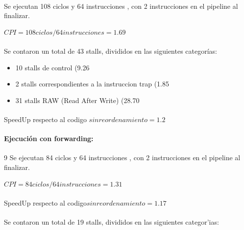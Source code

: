 \documentclass[a4paper,11pt]{article}
\begin{document}
\begin{enumerate}
\paragraph{}
Se ejecutan 108 ciclos y 64 instrucciones , con 2 instrucciones en el  pipeline al finalizar.

\begin{center}
$CPI = 108 ciclos / 64 instrucciones = 1.69 $
\end{center}

\paragraph{}
Se contaron un total de 43 stalls, divididos en las siguientes categorías:

\begin{itemize}
 \item 10 stalls de control (9.26%
 \item  2  stalls correspondientes a la instruccion trap (1.85%
 \item  31 stalls RAW (Read After Write) (28.70%
\end{itemize}

\paragraph{}
SpeedUp respecto al codigo $sin reordenamiento = 1.2$

\paragraph{Ejecuci\'on con forwarding:}

\paragraph{}9
Se ejecutan 84 ciclos y 64 instrucciones , con 2 instrucciones en el  pipeline al finalizar.

\begin{center}
$CPI = 84 ciclos / 64 instrucciones = 1.31$
\end{center}

\paragraph{}
SpeedUp respecto al codigo$ sin reordenamiento = 1.17$

\paragraph{} 
Se contaron un total de 19 stalls, divididos en las siguientes categor'ias:


\end{enumerate}
\end{document}
